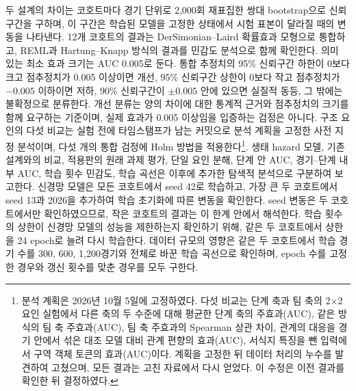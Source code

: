 두 설계의 차이는 코호트마다 경기 단위로 2,000회 재표집한 쌍대 bootstrap으로 신뢰구간을 구하며, 이 구간은 학습된 모델을 고정한 상태에서 시험 표본이 달라질 때의 변동을 나타낸다.
12개 코호트의 결과는 DerSimonian--Laird 확률효과 모형으로 통합하고, REML과 Hartung--Knapp 방식의 결과를 민감도 분석으로 함께 확인한다.
의미 있는 최소 효과 크기는 AUC 0.005로 둔다.
통합 추정치의 95\% 신뢰구간 하한이 0보다 크고 점추정치가 0.005 이상이면 개선, 95\% 신뢰구간 상한이 0보다 작고 점추정치가 $-0.005$ 이하이면 저하, 90\% 신뢰구간이 $\pm0.005$ 안에 있으면 실질적 동등, 그 밖에는 불확정으로 분류한다.
개선 분류는 양의 차이에 대한 통계적 근거와 점추정치의 크기를 함께 요구하는 기준이며, 실제 효과가 0.005 이상임을 입증하는 검정은 아니다.
구조 요인의 다섯 비교는 실험 전에 타임스탬프가 남는 커밋으로 분석 계획을 고정한 사전 지정 분석이며, 다섯 개의 통합 검정에 Holm 방법을 적용한다\footnote{분석 계획은 2026년 10월 5일에 고정하였다. 다섯 비교는 단계 축과 팀 축의 2$\times$2 요인 실험에서 다른 축의 두 수준에 대해 평균한 단계 축의 주효과(AUC), 같은 방식의 팀 축 주효과(AUC), 팀 축 주효과의 Spearman 상관 차이, 관계의 대응을 경기 안에서 섞은 대조 모델 대비 관계 편향의 효과(AUC), 서식지 특징을 뺀 입력에서 구역 객체 토큰의 효과(AUC)이다. 계획을 고정한 뒤 데이터 처리의 누수를 발견하여 고쳤으며, 모든 결과는 고친 자료에서 다시 얻었다. 이 수정은 이전 결과를 확인한 뒤 결정하였다.}.
생태 hazard 모델, 기존 설계와의 비교, 적용판의 원래 과제 평가, 단일 요인 분해, 단계 안 AUC, 경기--단계 내부 AUC, 학습 횟수 민감도, 학습 곡선은 이후에 추가한 탐색적 분석으로 구분하여 보고한다.
신경망 모델은 모든 코호트에서 seed 42로 학습하고, 가장 큰 두 코호트에서 seed 13과 2026을 추가하여 학습 초기화에 따른 변동을 확인한다.
seed 변동은 두 코호트에서만 확인하였으므로, 작은 코호트의 결과는 이 한계 안에서 해석한다.
학습 횟수의 상한이 신경망 모델의 성능을 제한하는지 확인하기 위해, 같은 두 코호트에서 상한을 24 epoch로 늘려 다시 학습한다.
데이터 규모의 영향은 같은 두 코호트에서 학습 경기 수를 300, 600, 1,200경기와 전체로 바꾼 학습 곡선으로 확인하며, epoch 수를 고정한 경우와 갱신 횟수를 맞춘 경우를 모두 구한다.
